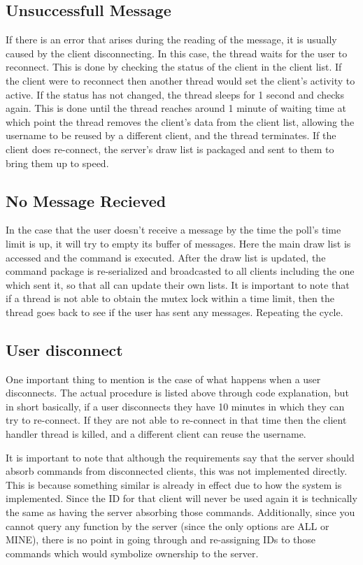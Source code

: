 \documentclass[12pt, a4paper]{report}
\begin{document}
\subsection{Unsuccessfull Message}
If there is an error that arises during the reading of the message, it is usually caused by the client disconnecting. In this case, the thread waits for the user to reconnect. This is done by checking the status of the client in the client list. If the client were to reconnect then another thread would set the client's activity to active. If the status has not changed, the thread sleeps for 1 second and checks again. This is done until the thread reaches around 1 minute of waiting time at which point the thread removes the client's data from the client list, allowing the username to be reused by a different client, and the thread terminates. If the client does re-connect, the server's draw list is packaged and sent to them to bring them up to speed.

\subsection{No Message Recieved}
In the case that the user doesn't receive a message by the time the poll's time limit is up, it will try to empty its buffer of messages. Here the main draw list is accessed and the command is executed. After the draw list is updated, the command package is re-serialized and broadcasted to all clients including the one which sent it, so that all can update their own lists. It is important to note that if a thread is not able to obtain the mutex lock within a time limit, then the thread goes back to see if the user has sent any messages. Repeating the cycle.

\subsection{User disconnect}
One important thing to mention is the case of what happens when a user disconnects. The actual procedure is listed above through code explanation, but in short basically, if a user disconnects they have 10 minutes in which they can try to re-connect. If they are not able to re-connect in that time then the client handler thread is killed, and a different client can reuse the username.

It is important to note that although the requirements say that the server should absorb commands from disconnected clients, this was not implemented directly. This is because something similar is already in effect due to how the system is implemented. Since the ID for that client will never be used again it is technically the same as having the server absorbing those commands. Additionally, since you cannot query any function by the server (since the only options are ALL or MINE), there is no point in going through and re-assigning IDs to those commands which would symbolize ownership to the server.
\end{document}
